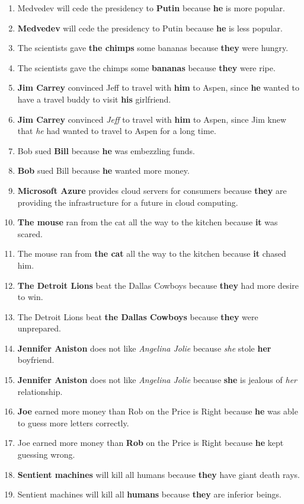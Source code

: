 \documentclass{article}
\begin{document}
\begin{enumerate}
	\item Medvedev will cede the presidency to {\bf Putin} because {\bf he} is more popular.
	\item {\bf Medvedev} will cede the presidency to Putin because {\bf he} is less popular.
	\item The scientists gave {\bf the chimps} some bananas because {\bf they} were hungry.
	\item The scientists gave the chimps some {\bf bananas} because {\bf they} were ripe.
	\item {\bf Jim Carrey} convinced Jeff to travel with {\bf him} to Aspen, since {\bf he} wanted to have a travel buddy to visit {\bf his} girlfriend.
	\item {\bf Jim Carrey} convinced {\it Jeff} to travel with {\bf him} to Aspen, since Jim knew that {\it he} had wanted to travel to Aspen for a long time.
	\item Bob sued {\bf Bill} because {\bf he} was embezzling funds.
	\item {\bf Bob} sued Bill because {\bf he} wanted more money.
	\item {\bf Microsoft Azure} provides cloud servers for consumers because {\bf they} are providing the infrastructure for a future in cloud computing.
	\item {\bf The mouse} ran from the cat all the way to the kitchen because {\bf it} was scared.
	\item The mouse ran from {\bf the cat} all the way to the kitchen because {\bf it} chased him.
	\item {\bf The Detroit Lions} beat the Dallas Cowboys because {\bf they} had more desire to win.
	\item The Detroit Lions beat {\bf the Dallas Cowboys} because {\bf they} were unprepared.
	\item {\bf Jennifer Aniston} does not like {\it Angelina Jolie} because {\it she} stole {\bf her} boyfriend.
	\item {\bf Jennifer Aniston} does not like {\it Angelina Jolie} because {\bf she} is jealous of {\it her} relationship.
	\item {\bf Joe} earned more money than Rob on the Price is Right because {\bf he} was able to guess more letters correctly.
	\item Joe earned more money than {\bf Rob} on the Price is Right because {\bf he} kept guessing wrong.
	\item {\bf Sentient machines} will kill all humans because {\bf they} have giant death rays.
	\item Sentient machines will kill all {\bf humans} because {\bf they} are inferior beings.

\end{enumerate}
\end{document}
